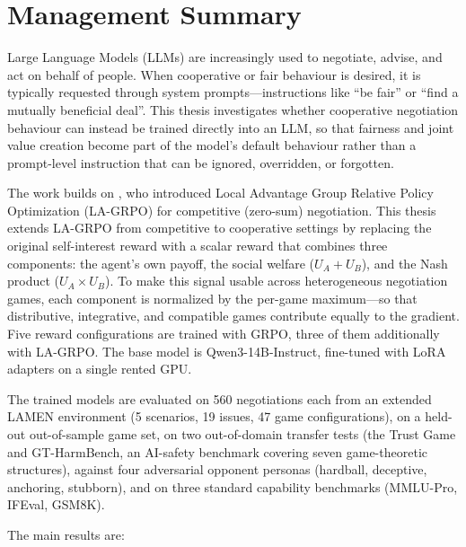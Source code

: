 \documentclass[12pt,a4paper]{article}
\begin{document}
\newpage
\section*{Management Summary}

Large Language Models (LLMs) are increasingly used to negotiate, advise, and act on behalf of people. When cooperative or fair behaviour is desired, it is typically requested through system prompts---instructions like ``be fair'' or ``find a mutually beneficial deal''. This thesis investigates whether cooperative negotiation behaviour can instead be trained directly into an LLM, so that fairness and joint value creation become part of the model's default behaviour rather than a prompt-level instruction that can be ignored, overridden, or forgotten.

The work builds on \citet{franceschetti2025advantage}, who introduced Local Advantage Group Relative Policy Optimization (LA-GRPO) for competitive (zero-sum) negotiation. This thesis extends LA-GRPO from competitive to cooperative settings by replacing the original self-interest reward with a scalar reward that combines three components: the agent's own payoff, the social welfare ($U_A + U_B$), and the Nash product ($U_A \times U_B$). To make this signal usable across heterogeneous negotiation games, each component is normalized by the per-game maximum---so that distributive, integrative, and compatible games contribute equally to the gradient. Five reward configurations are trained with GRPO, three of them additionally with LA-GRPO. The base model is Qwen3-14B-Instruct, fine-tuned with LoRA adapters on a single rented GPU.

The trained models are evaluated on 560 negotiations each from an extended LAMEN environment (5 scenarios, 19 issues, 47 game configurations), on a held-out out-of-sample game set, on two out-of-domain transfer tests (the Trust Game and GT-HarmBench, an AI-safety benchmark covering seven game-theoretic structures), against four adversarial opponent personas (hardball, deceptive, anchoring, stubborn), and on three standard capability benchmarks (MMLU-Pro, IFEval, GSM8K).

The main results are:
\end{document}
